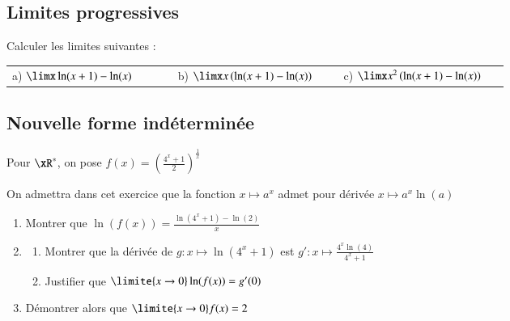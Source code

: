 \documentclass[oneside,12pt]{article}          %
\begin{document}
\subsection{Limites progressives}
Calculer les limites suivantes :

\begin{tabular}{p{0.3\linewidth}p{0.3\linewidth}p{0.3\linewidth}}
	a) $\limx \ln(x+1)-\ln(x)$ & b) $\limx x\left(\ln(x+1)-\ln(x)\right)$ & c) $\limx x^2\left(\ln(x+1)-\ln(x)\right)$
\end{tabular}



\subsection{Nouvelle forme indéterminée}
Pour $\xR^*$, on pose $f(x)=\left(\frac{4^x+1}{2}\right)^\frac{1}{x}$

On admettra dans cet exercice que la fonction $x\mapsto a^x$ admet pour dérivée $x\mapsto a^x\ln(a)$
\begin{enumerate}
    \item Montrer que $\ln(f(x))=\frac{\ln(4^x+1)-\ln(2)}{x}$
    \item \begin{enumerate}
        \item Montrer que la dérivée de $g:x\mapsto\ln(4^x+1)$ est $g':x\mapsto\frac{4^x\ln(4)}{4^x+1}$
        \item Justifier que $\limite{x\to0}\ln(f(x))=g'(0)$
    \end{enumerate}
    \item Démontrer alors que $\limite{x\to0}f(x)=2$
\end{enumerate}
\end{document}
